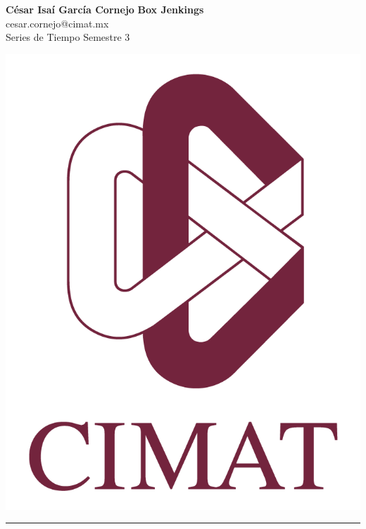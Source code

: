 \documentclass[a4paper, 11pt]{article}
\begin{document}
	\noindent
	
	\begin{minipage}[b][1.2cm][t]{0.8\textwidth}
		\large\textbf{César Isaí García Cornejo} \hfill \textbf{Box Jenkings}  \\
		cesar.cornejo@cimat.mx \hfill \\
		\normalsize Series de Tiempo \hfill Semestre 3\\
	\end{minipage}
	
	\hspace{14.4cm}
	\begin{minipage}[b][0.03cm][t]{0.12\linewidth}
		
		\vspace{-2.2cm}
		\includegraphics[scale=0.3]{Figures/EscudoCimat.png}
	\end{minipage}
	
	\noindent\rule{7in}{2.8pt}
	
\end{document}
